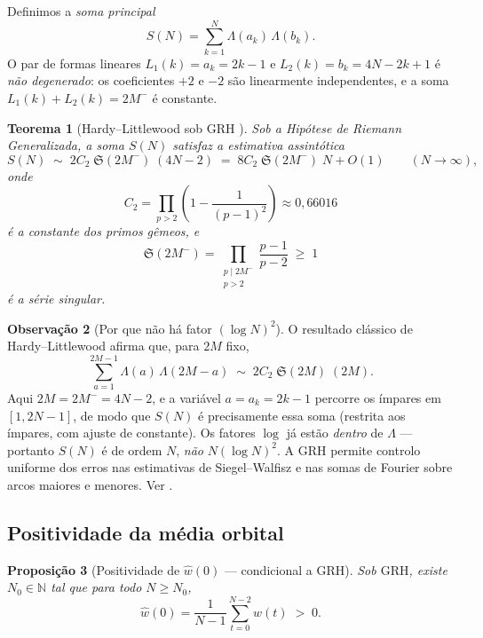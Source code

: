 \documentclass[12pt,a4paper]{article}
\newtheorem{theorem}{Teorema}[section]
\newtheorem{proposition}[theorem]{Proposição}
\theoremstyle{definition}
\newtheorem{remark}[theorem]{Observação}
\newcommand{\N}{\mathbb{N}}
\newcommand{\GRH}{\mathrm{GRH}}
\newcommand{\Lam}{\Lambda}             %
\newcommand{\Ss}{\mathfrak{S}}         %
\newcommand{\1}[1]{\mathbf{1}_{#1}}
\begin{document}
	Definimos a \emph{soma principal}
	\[
	S(N) = \sum_{k=1}^{N} \Lam(a_k)\,\Lam(b_k).
	\]
	O par de formas lineares $L_1(k) = a_k = 2k-1$ e $L_2(k) = b_k = 4N-2k+1$
	é \emph{não degenerado}: os coeficientes $+2$ e $-2$ são linearmente
	independentes, e a soma $L_1(k) + L_2(k) = 2M^-$ é constante.
	
	\begin{theorem}[Hardy--Littlewood sob $\GRH$ {\cite[Cap.~28]{davenport}}]
		\label{thm:HL}
		Sob a Hipótese de Riemann Generalizada, a soma $S(N)$ satisfaz a
		estimativa assintótica
		\[
		S(N) \;\sim\; 2C_2\;\Ss(2M^-)\;(4N-2)
		\;=\; 8C_2\;\Ss(2M^-)\;N + O(1)
		\qquad (N \to \infty),
		\]
		onde
		\[
		C_2 = \prod_{p > 2}\!\left(1 - \frac{1}{(p-1)^2}\right)
		\approx 0{,}66016
		\]
		é a \emph{constante dos primos gêmeos}, e
		\[
		\Ss(2M^-)
		= \prod_{\substack{p \mid 2M^- \\ p > 2}} \frac{p-1}{p-2}
		\;\geq\; 1
		\]
		é a \emph{série singular}.
	\end{theorem}
	
	\begin{remark}[Por que não há fator $(\log N)^2$]
		\label{rem:log}
		O resultado clássico de Hardy--Littlewood afirma que, para $2M$ fixo,
		\[
		\sum_{a=1}^{2M-1} \Lambda(a)\,\Lambda(2M-a) \;\sim\; 2C_2\;\Ss(2M)\;(2M).
		\]
		Aqui $2M = 2M^- = 4N-2$, e a variável $a = a_k = 2k-1$ percorre os
		ímpares em $[1, 2N-1]$, de modo que $S(N)$ é precisamente essa soma
		(restrita aos ímpares, com ajuste de constante). Os fatores $\log$ já
		estão \emph{dentro} de $\Lambda$ — portanto $S(N)$ é de ordem $N$,
		\emph{não} $N(\log N)^2$. A $\GRH$ permite controlo uniforme dos erros
		nas estimativas de Siegel--Walfisz e nas somas de Fourier sobre arcos
		maiores e menores. Ver \cite{davenport,iwaniec}.
	\end{remark}
	
	\subsection{Positividade da média orbital}
	
	\begin{proposition}[Positividade de $\widehat{w}(0)$ --- condicional a $\GRH$]
		\label{prop:pos}
		Sob $\GRH$, existe $N_0 \in \N$ tal que para todo $N \geq N_0$,
		\[
		\widehat{w}(0) = \frac{1}{N-1}\sum_{t=0}^{N-2} w(t) \;>\; 0.
		\]
	\end{proposition}
	
\end{document}
